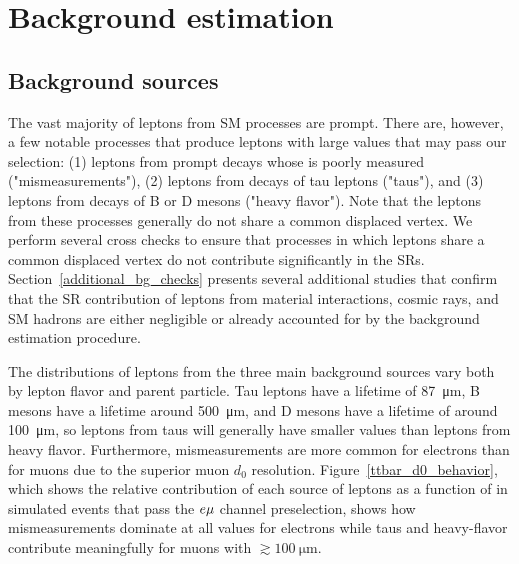 \section{Background estimation}
\label{bg}

\subsection{Background sources}
\label{bg_sources}
The vast majority of leptons from SM processes are prompt. There are, however, a few notable processes that produce leptons with large \ad values that may pass our selection: (1) leptons from prompt decays whose \ad is poorly measured ("mismeasurements"), (2) leptons from  decays of tau leptons ("taus"), and (3) leptons from decays of B or D mesons ("heavy flavor"). Note that the leptons from these processes generally do not share a common displaced vertex. We perform several cross checks to ensure that processes in which leptons share a common displaced vertex do not contribute significantly in the SRs. Section~\ref{additional_bg_checks} presents several additional studies that confirm that the SR contribution of leptons from material interactions, cosmic rays, and SM hadrons are either negligible or already accounted for by the background estimation procedure.


The \ad distributions of leptons from the three main background sources vary both by lepton flavor and parent particle. Tau leptons have a lifetime of \SI{87}{\um}, B mesons have a lifetime around \SI{500}{\um}, and D mesons have a lifetime of around \SI{100}{\um}, so leptons from taus will generally have smaller \ad values than leptons from heavy flavor. Furthermore, mismeasurements are more common for electrons than for muons due to the superior muon $d_0$ resolution. Figure~\ref{ttbar_d0_behavior}, which shows the relative contribution of each source of leptons as a function of \ad in simulated \ttbar events that pass the $e{\mu}$ channel preselection, shows how mismeasurements dominate at all \ad values for electrons while taus and heavy-flavor contribute meaningfully for muons with $\gtrsim\SI{100}{\um}$.



